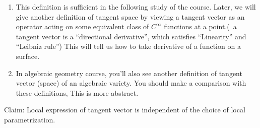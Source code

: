 \begin{remark}
    \hfill
    \begin{enumerate}[(1)]
        \item This definition is sufficient in the following study of the
              course. Later, we will give another definition of tangent space
              by viewing a tangent vector as an operator acting on some equivalent
              class of \(C^\infty\) functions at a point.(\ie\ a tangent vector
              is a ``directional derivative'', which satisfies ``Linearity'' and
              ``Leibniz rule'') This will tell us how to take derivative of a
              function on a surface.
        \item In algebraic geometry course, you'll also see another
              definition of tangent vector (space) of an algebraic variety.
              You should make a comparison with these definitions, This is
              more abstract.
    \end{enumerate}
\end{remark}
Claim: Local expression of tangent vector is independent of the choice
of local parametrization.
